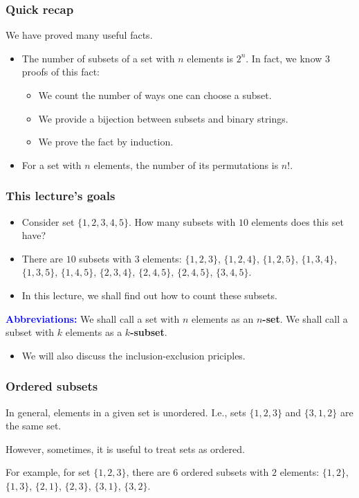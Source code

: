 

\begin{frame}\frametitle{Quick recap}
  We have proved many useful facts.
  \begin{itemize}
  \item The number of subsets of a set with $n$ elements is
    $2^n$. \pause In fact, we know 3 proofs of this fact:
    \begin{itemize}
    \item We count the number of ways one can choose a subset.
    \item We provide a bijection between subsets and binary strings.
    \item We prove the fact by induction.
    \end{itemize}
    \pause
  \item For a set with $n$ elements, the number of its permutations is
    $n!$.
  \end{itemize}
\end{frame}

\begin{frame}\frametitle{This lecture's goals}
  \begin{itemize}
  \item Consider set $\{1,2,3,4,5\}$.  How many subsets with $10$
    elements does this set have? \pause
  \item There are $10$ subsets with $3$ elements: $\{1,2,3\}$,
    $\{1,2,4\}$, $\{1,2,5\}$, $\{1,3,4\}$, $\{1,3,5\}$, $\{1,4,5\}$,
    $\{2,3,4\}$, $\{2,4,5\}$, $\{2,4,5\}$, $\{3,4,5\}$.
  \item In this lecture, we shall find out how to count these subsets. \pause
  \end{itemize}

  \begin{tcolorbox}
    {\bf\textcolor{blue}{Abbreviations:}} We shall call a set with $n$ elements as an
    {\bf $n$-set}.  We shall call a subset with $k$ elements as a {\bf
      $k$-subset}.
  \end{tcolorbox}

  \pause

  \begin{itemize}
  \item We will also discuss the inclusion-exclusion priciples.
  \end{itemize}
\end{frame}

\begin{frame}\frametitle{Ordered subsets}
  In general, elements in a given set is unordered.  I.e., sets
  $\{1,2,3\}$ and $\{3,1,2\}$ are the same set. \pause

  However, sometimes, it is useful to treat sets as ordered. \pause

  For example, for set $\{1,2,3\}$, there are $6$ ordered subsets with
  $2$ elements: $\{1,2\}$, $\{1,3\}$, $\{2,1\}$, $\{2,3\}$, $\{3,1\}$,
  $\{3,2\}$.
\end{frame}

